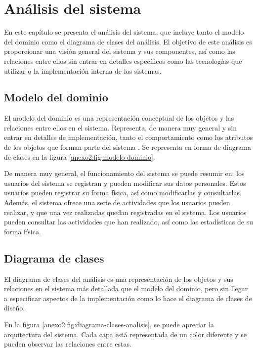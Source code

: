\chapter{Análisis del sistema}
\label{anexo2:cap:analisis}
En este capítulo se presenta el análisis del sistema, que incluye tanto el modelo del dominio como
el diagrama de clases del análisis. El objetivo de este análisis es proporcionar una visión general
del sistema y sus componentes, así como las relaciones entre ellos sin entrar en detalles específicos
como las tecnologías que utilizar o la implementación interna de los sistemas.

\section{Modelo del dominio}
\label{anexo2:sec:modelo-dominio}
El modelo del dominio es una representación conceptual de los objetos y las relaciones entre ellos
en el sistema. Representa, de manera muy general y sin entrar en detalles de implementación, tanto
el comportamiento como los atributos de los objetos que forman parte del sistema
\parencite{DomainModel}. Se representa en forma de diagrama de clases en la figura
\ref{anexo2:fig:modelo-dominio}.

De manera muy general, el funcionamiento del sistema se puede resumir en: los usuarios del sistema
se registran y pueden modificar sus datos personales. Estos usuarios pueden registrar su forma física,
así como modificarlas y consultarlas. Además, el sistema ofrece una serie de actividades que los usuarios
pueden realizar, y que una vez realizadas quedan registradas en el sistema. Los usuarios pueden
consultar las actividades que han realizado, así como las estadísticas de su forma física.


\section{Diagrama de clases}
\label{anexo2:sec:diagrama-clases-analisis}
El diagrama de clases del análisis es una representación de los objetos y sus relaciones en el
sistema más detallada que el modelo del dominio, pero sin llegar a especificar aspectos de la
implementación como lo hace el diagrama de clases de diseño.

En la figura \ref{anexo2:fig:diagrama-clases-analisis}, se puede apreciar la
arquitectura del sistema. Cada capa está representada de un color diferente y se
pueden observar las relaciones entre estas.



